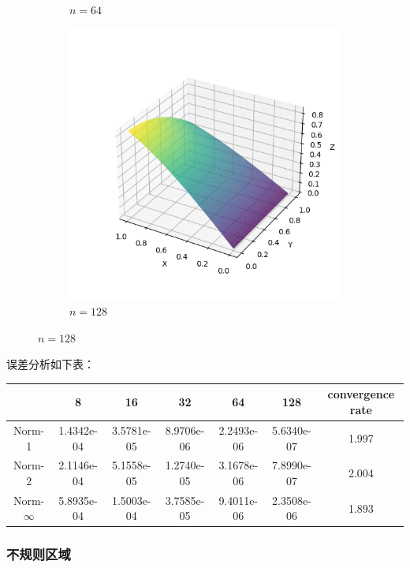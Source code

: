 \documentclass[lang=cn,a4paper,newtx,bibend=bibtex]{elegantpaper}
\begin{document}
\begin{figure}[H]
\begin{subfigure}[b]{0.18\textwidth}
      \caption{$n = 64$}
  \end{subfigure}
  \hfill
  \begin{subfigure}[b]{0.18\textwidth}
      \includegraphics[width=\textwidth]{../../res_bac/res-[data|2-mixed-regular-e128].png}
      \caption{$n = 128$}
  \end{subfigure}
\end{figure}

误差分析如下表：

\begin{table}[H]
  \centering
  \begin{tabular}{|c|c|c|c|c|c|c|}
  \hline
   & 8 & 16 & 32 & 64 & 128 & convergence rate \\
  \hline
  Norm-1 & 1.4342e-04 & 3.5781e-05 & 8.9706e-06 & 2.2493e-06 & 5.6340e-07 & 1.997 \\
  Norm-2 & 2.1146e-04 & 5.1558e-05 & 1.2740e-05 & 3.1678e-06 & 7.8990e-07 & 2.004 \\
  Norm-$\infty$ & 5.8935e-04 & 1.5003e-04 & 3.7585e-05 & 9.4011e-06 & 2.3508e-06 & 1.893 \\
  \hline
  \end{tabular}
  \end{table}

\subsubsection{不规则区域}
\end{document}
